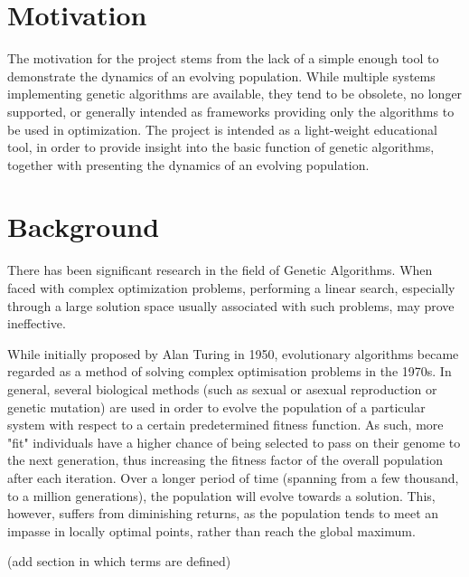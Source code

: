 \section{Motivation}
The motivation for the project stems from the lack of a simple enough tool to demonstrate the dynamics of an evolving population. While multiple systems implementing genetic algorithms are available, they tend to be obsolete, no longer supported, or generally intended as frameworks providing only the algorithms to be used in optimization. The project is intended as a light-weight educational tool, in order to provide insight into the basic function of genetic algorithms, together with presenting the dynamics of an evolving population.

\section{Background}
There has been significant research in the field of Genetic Algorithms. When faced with complex optimization problems, performing a linear search, especially through a large solution space usually associated with such problems, may prove ineffective. 

While initially proposed by Alan Turing in 1950, evolutionary algorithms became regarded as a method of solving complex optimisation problems in the 1970s. In general, several biological methods (such as sexual or asexual reproduction or genetic mutation) are used in order to evolve the population of a particular system with respect to a certain predetermined fitness function. As such, more "fit" individuals have a higher chance of being selected to pass on their genome to the next generation, thus increasing the fitness factor of the overall population after each iteration. Over a longer period of time (spanning from a few thousand, to a million generations), the population will evolve towards a solution. This, however, suffers from diminishing returns, as the population tends to meet an impasse in locally optimal points, rather than reach the global maximum.

(add section in which terms are defined)

